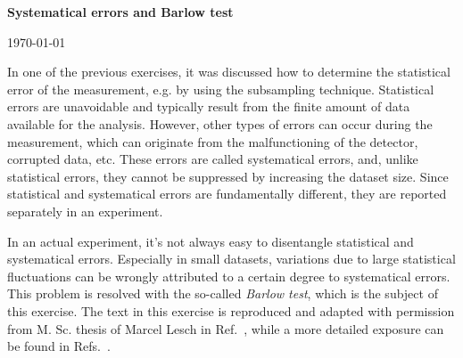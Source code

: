 \documentclass[11pt]{article}
\begin{document}
\begin{center}
\Large{\bf{Systematical errors and Barlow test}}\\
\end{center}
\begin{center}
{\small\today}
\end{center}

\bigskip

In one of the previous exercises, it was discussed how to determine the statistical error of the measurement, e.g. by using the subsampling technique. Statistical errors are unavoidable and typically result from the finite amount of data available for the analysis. However, other types of errors can occur during the measurement, which can originate from the malfunctioning of the detector, corrupted data, etc. These errors are called systematical errors, and, unlike statistical errors, they cannot be suppressed by increasing the dataset size. Since statistical and systematical errors are fundamentally different, they are reported separately in an experiment.

In an actual experiment, it's not always easy to disentangle statistical and systematical errors. Especially in small datasets, variations due to large statistical fluctuations can be wrongly attributed to a certain degree to systematical errors. This problem is resolved with the so-called {\it Barlow test}, which is the subject of this exercise. The text in this exercise is reproduced and adapted with permission from M. Sc. thesis of Marcel Lesch in Ref.~\cite{Lesch:2021}, while a more detailed exposure can be found in Refs.~\cite{Barlow:2002yb,Barlow:1}. 
\end{document}
